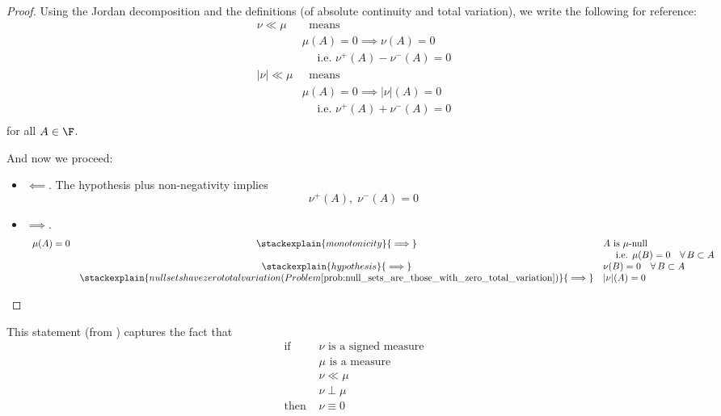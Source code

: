\documentclass{article} %
\begin{document}
\begin{proof}
Using the Jordan decomposition and the definitions (of absolute continuity and total variation), we write the following for reference:
\begin{align*}
\nu \ll \mu &\; \text{ means}  \\
&\mu(A) = 0 \implies \nu(A) = 0 \\
& \quad \text{ i.e. } \nu^+(A) - \nu^-(A) = 0 \\
|\nu| \ll \mu &\; \text{ means}  \\
&\mu(A) = 0 \implies |\nu|(A) = 0 \\
& \quad \text{ i.e. } \nu^+(A) + \nu^-(A) = 0 \\
\end{align*}
for all $A \in \F$.

And now we proceed:
\begin{itemize}
\item $\boxed{\impliedby}$. The hypothesis plus non-negativity implies
\[ \nu^+(A), \; \nu^-(A) =0 \]
\item $\boxed{\implies}$. 
\[ \begin{array}{rcl}
\mu(A) = 0  &\stackexplain{monotonicity}{\implies} & A \text{ is $\mu$-null } \\
&& \quad \text{ i.e. } \mu(B)=0 \quad \forall \, B \subset A \\
& \stackexplain{hypothesis}{\implies} &  \nu(B) = 0 \quad \forall \, B \subset A \\
& \stackexplain{null sets have zero total variation (Problem \ref{prob:null_sets_are_those_with_zero_total_variation}) }{\implies}& |\nu|(A) = 0  
\end{array}
\] 


\end{itemize}

\end{proof}

\begin{remark}{}

This statement (from \cite{folland1999real}) captures the fact that 
%
\[ \begin{array}{rl}
\text{ if } & \nu \text{ is a signed measure } \\
   & \mu \text{ is a measure } \\
   & \nu \ll \mu \\
   & \nu \perp \mu \\
\text{ then } & \nu \equiv 0
\end{array}
\]
%

	
\label{rk:absolute_continuity_is_the_antithesis_of_mutual_singularity}
\end{remark}
\end{document}
